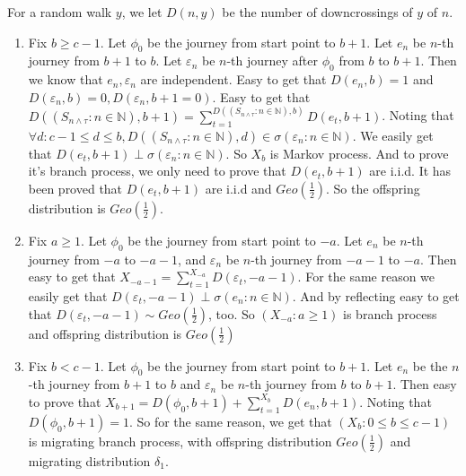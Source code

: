 \documentclass{ctexart}
\begin{document}
\begin{solution}
  For a random walk \(y\), we let \(D(n,y)\) be the number of downcrossings of \(y\) of \(n\).
  \begin{enumerate}
    \item Fix \(b \geq c-1\). Let \(\phi_0\) be the journey from start point to \(b+1\).
      Let \(e_n\) be \(n\)-th journey from \(b+1\) to \(b\).
      Let \(\varepsilon_n\) be \(n\)-th journey after \(\phi_0\) from \(b\) to \(b+1\).
      Then we know that \(e_n,\varepsilon_n\) are independent.
      Easy to get that \(D(e_n,b)=1\) and \(D(\varepsilon_n,b)=0,D(\varepsilon_n,b+1=0)\).
      Easy to get that \(D((S_{n \wedge \tau}:n \in \mathbb{N}),b+1)=\sum_{t=1}^{D((S_{n \wedge \tau}:n \in \mathbb{N}),b)} D(e_t,b+1) \).
      Noting that \(\forall d:c-1 \leq d \leq b,D((S_{n \wedge \tau}:n \in \mathbb{N}),d) \in \sigma(\varepsilon_n:n \in \mathbb{N})\).
      We easily get that \(D(e_t,b+1) \perp \sigma(\varepsilon_n:n \in \mathbb{N})\).
      So \(X_b\) is Markov process. And to prove it's branch process, we only need to prove that \(D(e_t,b+1)\) are i.i.d.
      It has been proved that \(D(e_t,b+1)\) are i.i.d and \(Geo(\frac{1}{2})\).
      So the offspring distribution is \(Geo(\frac{1}{2})\).
    \item Fix \(a \geq 1\). Let \(\phi_0\) be the journey from start point to \(-a\).
      Let \(e_n\) be \(n\)-th journey from \(-a\) to \(-a-1\), and \(\varepsilon_n\) be \(n\)-th journey from \(-a-1\) to \(-a\).
      Then easy to get that \(X_{-a-1}=\sum_{t=1}^{X_{-a}} D(\varepsilon_t,-a-1)\).
      For the same reason we easily get that \(D(\varepsilon_t,-a-1)\perp \sigma(e_n:n \in \mathbb{N})\).
      And by reflecting easy to get that \(D(\varepsilon_t,-a-1) \sim Geo(\frac{1}{2})\), too.
      So \((X_{-a}:a \geq 1)\) is branch process
      and offspring distribution is \(Geo(\frac{1}{2})\)

    \item Fix \(b<c-1\). Let \(\phi_0\) be the journey from start point to \(b+1\).
      Let \(e_n\) be the \(n\)-th journey from \(b+1\) to \(b\) and \(\varepsilon_n\) be \(n\)-th journey from \(b\) to \(b+1\).
      Then easy to prove that \(X_{b+1}=D(\phi_0,b+1)+\sum_{t=1}^{X_b} D(e_n,b+1)\).
      Noting that \(D(\phi_0,b+1)=1\). So for the same reason, we get that \((X_b:0 \leq b \leq c-1)\) is migrating branch process,
      with offspring distribution \(Geo(\frac{1}{2})\) and migrating distribution \(\delta_1\).
  \end{enumerate}
\end{solution}
\end{document}
